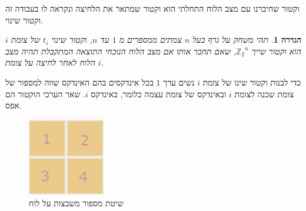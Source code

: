 \documentclass[12pt,leqno]{article}
\theoremstyle{theoremdd}
\newtheorem{definition}{הגדרה}[section]
\newcommand{\Zn}{{\mathbb{Z}_2}^n}
\begin{document}
וקטור שחיברנו עם מצב הלוח התחלתי הוא וקטור שמתאר את הלחיצה ונקראה לו בעבודה זה וקטור שינוי.
 \begin{definition}
    תהי 
    משחק על גרף בעל
    $n$
    צמתים
    ממספרים מ
    $1$
    עד
    $n$,
    וקטור שינוי
    $t_i$
    של צומת  
    $i$
    הוא 
    וקטור 
    שייך 
    $\Zn$,
    שאם תחבר אותו אם מצב הלוח הנוכחי 
    התוצאה המתקבלת תהיה מצב הלוח 
    לאחר לחיצה על צומת 
    $i$.
\end{definition}
כדי לבנות וקטור שינו 
של 
צומת 
$i$
נשים ערך 
$1$
בכל אינדקסים 
בהם האינדקס שווה 
למספור 
של 
צומת 
שכנה
לצומת
$i$
ובאינדקס של צומת עצמה
כלומר,
באינדקס 
$i$.
שאר הערכי הוקטור הם אפס.

\begin{figure}[ht]
    \caption{שיטת מספור משבצות על לוח}
    \label{fig:numbering_board_2x2}
    \centering
    \includegraphics[width=0.3\textwidth,keepaspectratio]{images/numbering_board_2x2.PNG}
\end{figure}
\end{document}
